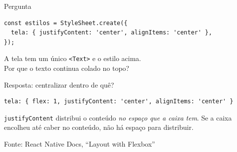 \documentclass[aspectratio=169]{beamer}
\newcommand{\fonte}[1]{\vfill\hfill{\scriptsize\textcolor{UFSGray}{Fonte: #1}}}
\begin{document}
\begin{frame}[fragile]{Pergunta}
\begin{lstlisting}[style=js]
const estilos = StyleSheet.create({
  tela: { justifyContent: 'center', alignItems: 'center' },
});
\end{lstlisting}
  \begin{center}
    \vspace{0.5em}
    {\large A tela tem um único \texttt{<Text>} e o estilo acima.}\\[0.5em]
    {\large Por que o texto continua colado no topo?}
  \end{center}
\end{frame}

\begin{frame}[fragile]{Resposta: centralizar dentro de quê?}
\begin{lstlisting}[style=js]
tela: { flex: 1, justifyContent: 'center', alignItems: 'center' }
\end{lstlisting}
  \begin{center}
  \end{center}
  \begin{alertblock}{}
    \texttt{justifyContent} distribui o conteúdo \emph{no espaço que a caixa tem}.
    Se a caixa encolheu até caber no conteúdo, não há espaço para distribuir.
  \end{alertblock}
  \fonte{React Native Docs, ``Layout with Flexbox''~\cite{reactnative2025docs}}
\end{frame}
\end{document}
